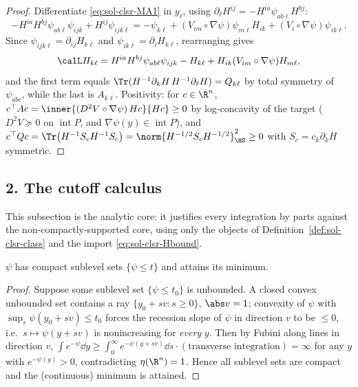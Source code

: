 \documentclass[../main.tex]{subfiles}
\begin{document}
\begin{proof}
Differentiate \eqref{eq:sol-clsr-MA1} in $y_\ell$, using
$\partial_\ell H^{ij}=-H^{ia}\psi_{ab\ell}H^{bj}$:
\[
  -H^{ia}H^{bj}\psi_{ab\ell}\psi_{ijk}+H^{ij}\psi_{ijk\ell}
  =-\psi_{k\ell}+(V_{im}\circ\nabla\psi)\psi_{m\ell}H_{ik}
   +(V_i\circ\nabla\psi)\psi_{ik\ell} .
\]
Since $\psi_{ijk\ell}=\partial_{ij}H_{k\ell}$ and $\psi_{ik\ell}=\partial_iH_{k\ell}$,
rearranging gives
\[
  \calL H_{k\ell}
  =H^{ia}H^{bj}\psi_{ab\ell}\psi_{ijk}-H_{k\ell}
   +H_{ik}(V_{im}\circ\nabla\psi)H_{m\ell},
\]
and the first term equals $\Tr(H^{-1}\partial_kH\,H^{-1}\partial_\ell H)=Q_{k\ell}$ by total
symmetry of $\psi_{abc}$, while the last is $A_{k\ell}$.  Positivity: for $c\in\R^n$,
$c^\top Ac=\inner{(D^2V\circ\nabla\psi)\,Hc}{Hc}\ge0$ by log-concavity of the target
($D^2V\succeq0$ on $\operatorname{int}P$, and $\nabla\psi(y)\in\operatorname{int}P$), and
$c^\top Qc=\Tr\bigl(H^{-1}S_cH^{-1}S_c\bigr)
=\norm{H^{-1/2}S_cH^{-1/2}}_{\HS}^2\ge0$ with $S_c=c_k\partial_kH$ symmetric.
\end{proof}

\subsection*{2. The cutoff calculus}

This subsection is the analytic core: it justifies every integration by parts against the
non-compactly-supported core, using only the objects of
Definition~\ref{def:sol-clsr-class} and the import \eqref{eq:sol-clsr-Hbound}.

\begin{lemma}[Coercivity]
\label{lem:sol-clsr-coercive}
$\psi$ has compact sublevel sets $\{\psi\le t\}$ and attains its minimum.
\end{lemma}

\begin{proof}
Suppose some sublevel set $\{\psi\le t_0\}$ is unbounded.  A closed convex unbounded set
contains a ray $\{y_0+sv:s\ge0\}$, $\abs v=1$; convexity of $\psi$ with
$\sup_s\psi(y_0+sv)\le t_0$ forces the recession slope of $\psi$ in direction $v$ to be
$\le0$, i.e.\ $s\mapsto\psi(y+sv)$ is nonincreasing for \emph{every} $y$.  Then by Fubini
along lines in direction $v$, $\int e^{-\psi}\dd y\ge\int_0^\infty e^{-\psi(y+sv)}\dd s\cdot
(\text{transverse integration})=\infty$ for any $y$ with $e^{-\psi(y)}>0$, contradicting
$\eta(\R^n)=1$.  Hence all sublevel sets are compact and the (continuous) minimum is attained.
\end{proof}
\end{document}
